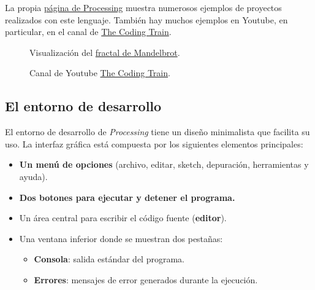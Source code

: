\documentclass[
  spanish,
  11pt,
  a4paper,
  DIV=11,
  numbers=noendperiod]{scrartcl}
\providecommand{\tightlist}{%
  \setlength{\itemsep}{0pt}\setlength{\parskip}{0pt}}
\begin{document}

La propia \href{https://processing.org/examples/}{página de Processing} muestra numerosos ejemplos de proyectos realizados con este lenguaje. También hay muchos ejemplos en Youtube, en particular, en el canal de \href{https://www.youtube.com/c/TheCodingTrain}{The Coding Train}.

\begin{figure}


\caption{\label{fig-mandelbrot}Visualización del \href{https://processing.org/examples/mandelbrot.html}{fractal de Mandelbrot}.}

\end{figure}%

\begin{figure}

\caption{\label{fig-thecodetrain}Canal de Youtube \href{https://www.youtube.com/c/TheCodingTrain}{The Coding Train}.}

\end{figure}%

\subsection{El entorno de desarrollo}

\label{el-entorno-de-desarrollo}

El entorno de desarrollo de \emph{Processing} tiene un diseño minimalista que facilita su uso. La interfaz gráfica está compuesta por los siguientes elementos principales:

\begin{itemize}
\tightlist
\item
  \textbf{Un menú de opciones} (archivo, editar, sketch, depuración, herramientas y ayuda).
\item
  \textbf{Dos botones para ejecutar y detener el programa.}
\item
  Un área central para escribir el código fuente (\textbf{editor}).
\item
  Una ventana inferior donde se muestran dos pestañas:

  \begin{itemize}
  \tightlist
  \item
    \textbf{Consola}: salida estándar del programa.
  \item
    \textbf{Errores}: mensajes de error generados durante la ejecución.
  \end{itemize}
\end{itemize}
\end{document}
